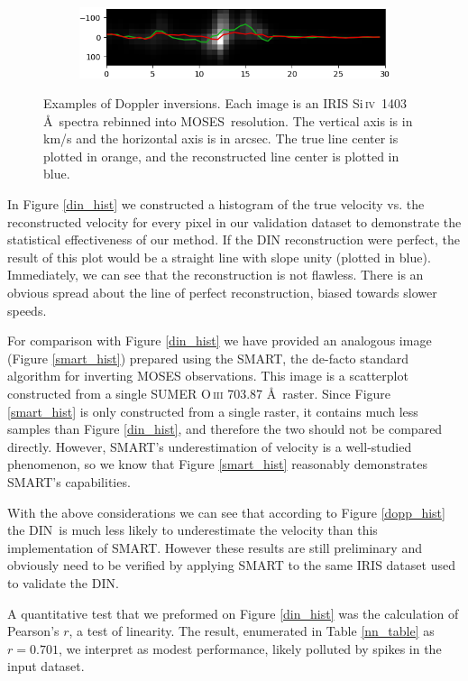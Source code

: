 \documentclass[10pt,letterpaper]{article}
\newcommand{\SiIV}{Si\,\textsc{iv}~1403\,\AA}
\newcommand{\MOSES}{\ac{MOSES}}
\newcommand{\SMART}{\ac{SMART}}
\newcommand{\DIN}{\ac{DIN}}
\begin{document}
\begin{figure}[h!]
\begin{subfigure}[t]{0.49\textwidth}
						\centering
						\includegraphics[width=\textwidth]{fig/doppler_1343}
					\end{subfigure}
					\caption{Examples of Doppler inversions. Each image is an IRIS \SiIV\ spectra rebinned into \MOSES\ resolution. The vertical axis is in km/s and the horizontal axis is in arcsec. The true line center is plotted in orange, and the reconstructed line center is plotted in blue.}
					\label{dopp_ex}
				\end{figure}

				In Figure \ref{din_hist} we constructed a histogram of the true velocity vs. the reconstructed velocity for every pixel in our validation dataset to demonstrate the statistical effectiveness of our method.
				If the DIN reconstruction were perfect, the result of this plot would be a straight line with slope unity (plotted in blue).
				Immediately, we can see that the reconstruction is not flawless. 
				There is an obvious spread about the line of perfect reconstruction, biased towards slower speeds.
				
				For comparison with Figure \ref{din_hist} we have provided an analogous image (Figure \ref{smart_hist}) prepared using the \SMART, the de-facto standard algorithm for inverting MOSES observations.
				This image is a scatterplot constructed from a single SUMER O\,\textsc{iii} 703.87 \AA\ raster.
				Since Figure \ref{smart_hist} is only constructed from a single raster, it contains much less samples than Figure \ref{din_hist}, and therefore the two should not be compared directly.
				However, SMART's underestimation of velocity is a well-studied phenomenon, so we know that Figure \ref{smart_hist} reasonably demonstrates SMART's capabilities.
				
				With the above considerations we can see that according to Figure \ref{dopp_hist} the \DIN\ is much less likely to underestimate the velocity than this implementation of SMART.
				However these results are still preliminary and obviously need to be verified by applying SMART to the same IRIS dataset used to validate the DIN.
				
				A quantitative test that we preformed on Figure \ref{din_hist} was the calculation of Pearson's $r$, a test of linearity.
				The result, enumerated in Table \ref{nn_table} as $r = 0.701$, we interpret as modest performance, likely polluted by spikes in the input dataset.
			
\end{document}

